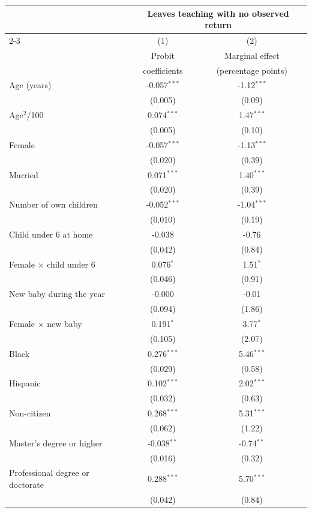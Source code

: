 \begin{tabular}{lcc}
\toprule
 & \multicolumn{2}{c}{Leaves teaching with no observed return} \\
\cmidrule(lr){2-3}
 & (1) & (2) \\
 & Probit & Marginal effect \\
 & coefficients & (percentage points) \\
\midrule
Age (years) & -0.057$^{***}$ & -1.12$^{***}$ \\
 & (0.005) & (0.09) \\[2pt]
Age$^2$/100 & 0.074$^{***}$ & 1.47$^{***}$ \\
 & (0.005) & (0.10) \\[2pt]
Female & -0.057$^{***}$ & -1.13$^{***}$ \\
 & (0.020) & (0.39) \\[2pt]
Married & 0.071$^{***}$ & 1.40$^{***}$ \\
 & (0.020) & (0.39) \\[2pt]
Number of own children & -0.052$^{***}$ & -1.04$^{***}$ \\
 & (0.010) & (0.19) \\[2pt]
Child under 6 at home & -0.038 & -0.76 \\
 & (0.042) & (0.84) \\[2pt]
Female $\times$ child under 6 & 0.076$^{*}$ & 1.51$^{*}$ \\
 & (0.046) & (0.91) \\[2pt]
New baby during the year & -0.000 & -0.01 \\
 & (0.094) & (1.86) \\[2pt]
Female $\times$ new baby & 0.191$^{*}$ & 3.77$^{*}$ \\
 & (0.105) & (2.07) \\[2pt]
Black & 0.276$^{***}$ & 5.46$^{***}$ \\
 & (0.029) & (0.58) \\[2pt]
Hispanic & 0.102$^{***}$ & 2.02$^{***}$ \\
 & (0.032) & (0.63) \\[2pt]
Non-citizen & 0.268$^{***}$ & 5.31$^{***}$ \\
 & (0.062) & (1.22) \\[2pt]
Master's degree or higher & -0.038$^{**}$ & -0.74$^{**}$ \\
 & (0.016) & (0.32) \\[2pt]
Professional degree or doctorate & 0.288$^{***}$ & 5.70$^{***}$ \\
 & (0.042) & (0.84) \\[2pt]

\end{tabular}
